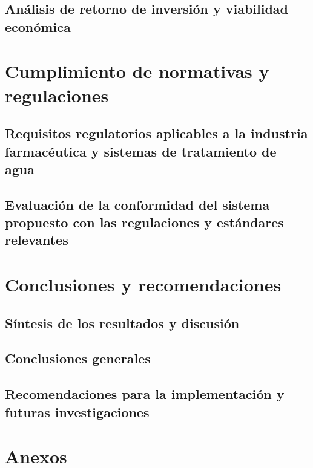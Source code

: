 \documentclass[
	spanish, %
	letterpaper, oneside
]{book}
\begin{document}
\section{Análisis de retorno de inversión y viabilidad económica}

\chapter{Cumplimiento de normativas y regulaciones}
\section{Requisitos regulatorios aplicables a la industria farmacéutica y sistemas de tratamiento de agua}
\section{ Evaluación de la conformidad del sistema propuesto con las regulaciones y estándares relevantes}

\chapter{Conclusiones y recomendaciones}
\section*{Síntesis de los resultados y discusión}
\section*{Conclusiones generales}
\section*{Recomendaciones para la implementación y futuras investigaciones}

% 
\chapter{Anexos}



\end{document}
